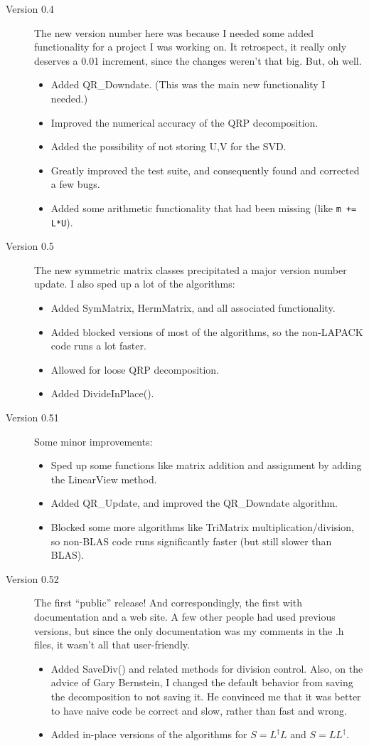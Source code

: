 \documentclass[twoside,letterpaper,11pt]{article}
\renewcommand{\tt}[1]{{\texttt {#1}}}
\begin{document}
\begin{description}
\item[Version 0.4]
The new version number here was because I needed some added functionality for a
project I was working on.  It retrospect, it really only deserves a 0.01 increment,
since the changes weren't that big.  But, oh well.
\begin{itemize}
\item
Added QR\_Downdate.  (This was the main new functionality I needed.)
\item
Improved the numerical accuracy of the QRP decomposition.
\item
Added the possibility of not storing U,V for the SVD.
\item
Greatly improved the test suite, and consequently found and corrected a few bugs.
\item
Added some arithmetic functionality that had been missing (like \tt{m += L*U}).
\end{itemize}

\item[Version 0.5]
The new symmetric matrix classes precipitated a major version number update.
I also sped up a lot of the algorithms:
\begin{itemize}
\item
Added SymMatrix, HermMatrix, and all associated functionality.
\item
Added blocked versions of most of the algorithms, so the non-LAPACK
code runs a lot faster.
\item
Allowed for loose QRP decomposition.
\item
Added DivideInPlace().
\end{itemize}

\item[Version 0.51]
Some minor improvements:
\begin{itemize}
\item
Sped up some functions like matrix addition and assignment by adding the 
LinearView method.
\item
Added QR\_Update, and improved the QR\_Downdate algorithm.
\item
Blocked some more algorithms like TriMatrix multiplication/division, so non-BLAS
code runs significantly faster (but still slower than BLAS).
\end{itemize}

\item[Version 0.52]
The first ``public'' release!  And correspondingly, the first with documentation
and a web site.  A few other people had used previous versions, but since the
only documentation was my comments in the .h files, it wasn't all that user-friendly.
\begin{itemize}
\item
Added SaveDiv() and related methods for division control.  Also, on the advice 
of Gary Bernstein, I changed the 
default behavior from saving the decomposition to not saving it.
He convinced me that it was better to have naive code 
be correct and slow, rather than fast and wrong. 
\item
Added in-place versions of the algorithms for $S = L^\dagger L$ and $S = L L^\dagger$.
\end{itemize}


\end{description}
\end{document}
